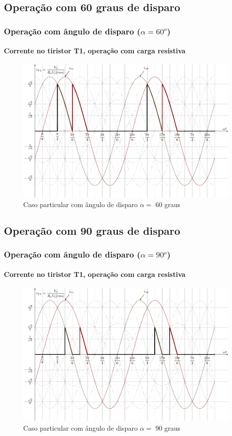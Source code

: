 \documentclass[aspectratio=43]{beamer}
\begin{document}
\subsection{Operação com 60 graus de disparo}
\begin{frame}
	\frametitle{Operação com ângulo de disparo  ($\alpha=60^o$)}
	\framesubtitle{Corrente no tiristor T1, operação com carga resistiva}
	
	\begin{figure}
		\centering
		\includegraphics[width=0.7\linewidth]{figuras/SenosDrawSEQnT1alpha60}
		\caption{Caso particular com ângulo de disparo $\alpha =$ 60 graus}
		\label{fig:SenosDrawSEQnT1alpha60}
	\end{figure}	
\end{frame}


\subsection{Operação com 90 graus de disparo}
\begin{frame}
	\frametitle{Operação com ângulo de disparo ($\alpha=90^o$)}
	\framesubtitle{Corrente no tiristor T1, operação com carga resistiva}
	
	\begin{figure}
		\centering
		\includegraphics[width=0.7\linewidth]{figuras/SenosDrawSEQnT1alphaR90}
		\caption{Caso particular com ângulo de disparo $\alpha =$ 90 graus}
		\label{fig:SenosDrawSEQnT1alpha90}
	\end{figure}	
\end{frame}
\end{document}
